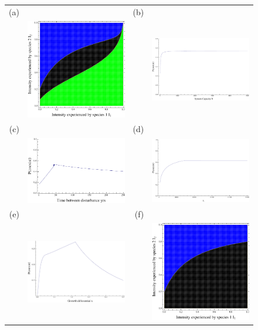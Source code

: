 \begin{figure}[htbp]
\centering
\begin{tabular}{rrrr}
(a)&&(b)&\\
&\includegraphics[width=2in]{fullexample}&&\includegraphics[width=2in]{fullintwithN} \\
(c)&&(d)&\\
&\includegraphics[width=2in]{fullintwTd}&&\includegraphics[width=2in]{fullintwiths1} \\
(e)&&(f)&\\
&\includegraphics[width=2in]{fulltointwx}&&\includegraphics[width=2in]{fulllarges1}

\end{tabular}
\end{figure}
